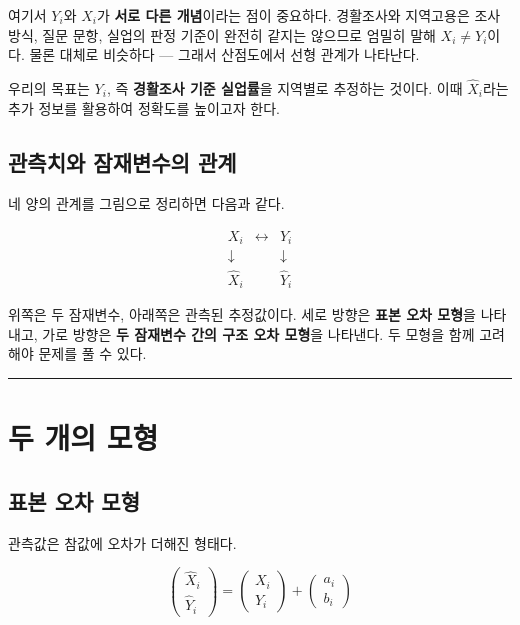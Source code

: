\documentclass[
  letterpaper,
  DIV=11,
  numbers=noendperiod]{scrreprt}
\begin{document}
여기서 \(Y_i\)와 \(X_i\)가 \textbf{서로 다른 개념}이라는 점이 중요하다.
경활조사와 지역고용은 조사 방식, 질문 문항, 실업의 판정 기준이 완전히
같지는 않으므로 엄밀히 말해 \(X_i \neq Y_i\)이다. 물론 대체로 비슷하다
--- 그래서 산점도에서 선형 관계가 나타난다.

우리의 목표는 \(Y_i\), 즉 \textbf{경활조사 기준 실업률}을 지역별로
추정하는 것이다. 이때 \(\hat{X}_i\)라는 추가 정보를 활용하여 정확도를
높이고자 한다.

\subsection{관측치와 잠재변수의
관계}\label{uxad00uxce21uxce58uxc640-uxc7a0uxc7acuxbcc0uxc218uxc758-uxad00uxacc4}

네 양의 관계를 그림으로 정리하면 다음과 같다.

\[
\begin{array}{ccc}
X_i & \longleftrightarrow & Y_i \\
\downarrow & & \downarrow \\
\hat{X}_i & & \hat{Y}_i
\end{array}
\]

위쪽은 두 잠재변수, 아래쪽은 관측된 추정값이다. 세로 방향은 \textbf{표본
오차 모형}을 나타내고, 가로 방향은 \textbf{두 잠재변수 간의 구조 오차
모형}을 나타낸다. 두 모형을 함께 고려해야 문제를 풀 수 있다.

\begin{center}\rule{0.5\linewidth}{0.5pt}\end{center}

\section{두 개의 모형}\label{uxb450-uxac1cuxc758-uxbaa8uxd615-1}

\subsection{표본 오차
모형}\label{uxd45cuxbcf8-uxc624uxcc28-uxbaa8uxd615}

관측값은 참값에 오차가 더해진 형태다.

\[\begin{pmatrix} \hat{X}_i \\ \hat{Y}_i \end{pmatrix} = \begin{pmatrix} X_i \\ Y_i \end{pmatrix} + \begin{pmatrix} a_i \\ b_i \end{pmatrix} \tag{1}\]
\end{document}
